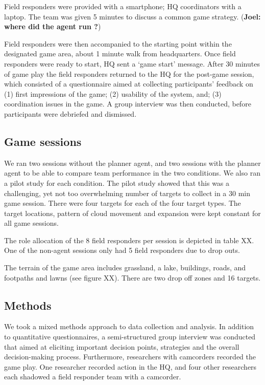 Field responders were provided with a smartphone; HQ coordinators with a laptop. The team was given 5 minutes to discuss a common game strategy. (\textbf{Joel: where did the agent run ?})

Field responders were then accompanied to the starting point within the designated game area, about 1 minute walk from headquarters. Once field responders were ready to start, HQ sent a `game start' message. After 30 minutes of game play the field responders returned to the HQ for the post-game session, which consisted of a questionnaire aimed at collecting participants' feedback on (1) first impressions of the game; (2) usability of the system, and; (3) coordination issues in the game. A group interview was then conducted, before participants were debriefed and dismissed.

\subsection{Game sessions}
We ran two sessions without the planner agent, and two sessions with the planner agent to be able to compare team performance in the two conditions. We also ran a pilot study for each condition. The pilot study showed that this was a challenging, yet not too overwhelming number of targets to collect in a 30 min game session. There were four targets for each of the four target types.
The target locations, pattern of cloud movement and expansion were kept constant for all game sessions. 

The role allocation of the 8 field responders per session is depicted in table XX. One of the non-agent sessions only had 5 field responders due to drop outs. 

The terrain of the game area includes grassland, a lake, buildings, roads, and footpaths and lawns (see figure XX). There are two drop off zones and 16 targets.

\subsection{Methods}
We took a mixed methods approach to data collection and analysis. In addition to quantitative questionnaires, a semi-structured group interview was conducted that aimed at eliciting important decision points, strategies and the overall decision-making process. Furthermore, researchers with camcorders recorded the game play. One researcher recorded action in the HQ, and four other researchers each shadowed a field responder team with a camcorder.


